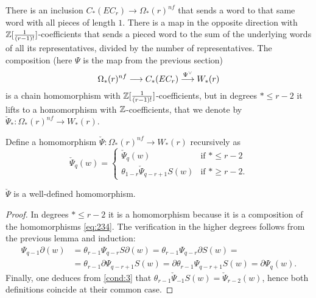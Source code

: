 	There is an inclusion $C_*(EC_r)\to \Omega_*(r)^{nf}$ that sends a word to that same word with all pieces of length $1$. There is a map in the opposite direction with $\mathbb{Z}[\frac{1}{(r-1)!}]$-coefficients that sends a pieced word to the sum of the underlying words of all its representatives, divided by the number of representatives. The composition (here $\Psi$ is the map from the previous section)
	\begin{equation}\label{eq:234}
		\Omega_*(r)^{nf}\longrightarrow C_*(EC_r)\overset{\Psi^\vee}{\longrightarrow} W_*(r)
	\end{equation}
	is a chain homomorphism with $\mathbb{Z}[\frac{1}{(r-1)!}]$-coefficients, but in degrees $*\leq r-2$ it lifts to a homomorphism with $\mathbb{Z}$-coefficients, that we denote by $\check{\Psi}_*\colon \Omega_*(r)^{nf}\to W_*(r)$.

	\begin{definition} Define a homomorphism $\check{\Psi}\colon \Omega_*(r)^{nf}\to W_*(r)$ recursively as
		\[\check{\Psi}_q(w) = \begin{cases} \check{\Psi}_q(w) & \text{if $*\leq r-2$} \\
			\theta_{1-r}\check{\Psi}_{q-r+1}S(w) & \text{if $*\geq r-2$.}\end{cases}\]
	\end{definition}



	\begin{lemma} $\check{\Psi}$ is a well-defined homomorphism. %
	\end{lemma}
	\begin{proof}
		In degrees $*\leq r-2$ it is a homomorphism because it is a composition of the homomorphisms \eqref{eq:234}. The verification in the higher degrees follows from the previous lemma and induction:
		\begin{align*}
			\Psi_{q-1}\partial(w) &= \theta_{r-1}\Psi_{q-r}S\partial(w) = \theta_{r-1}\Psi_{q-r}\partial S(w) = \\
			&=\theta_{r-1}\partial\Psi_{q-r+1}S(w) = \partial\theta_{r-1}\Psi_{q-r+1}S(w) = \partial \Psi_{q}(w).
		\end{align*}
		Finally, one deduces from \eqref{cond:3} that $\theta_{r-1}\check{\Psi}_{-1}S(w) = \check{\Psi}_{r-2}(w)$, hence both definitions coincide at their common case.
	\end{proof}


